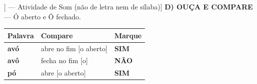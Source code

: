 \begin{exercicio}[Som /ó/ aberto [[O]] --- Atividade de Som (não de letra nem de sílaba)]
\textbf{D) OUÇA E COMPARE} --- Ó aberto e Ô fechado.

\begin{center}
\begin{tabular}{@{}p{4.2cm}p{6.2cm}p{1.6cm}@{}}
\hline
\textbf{Palavra} & \textbf{Compare} & \textbf{Marque} \\
\hline
\textbf{avó} & abre no fim [o aberto] & \textbf{SIM} \\
\textbf{avô} & fecha no fim [o] & \textbf{NÃO} \\
\textbf{pó} & abre [o aberto] & \textbf{SIM} \\
\hline
\end{tabular}
\end{center}

\end{exercicio}

